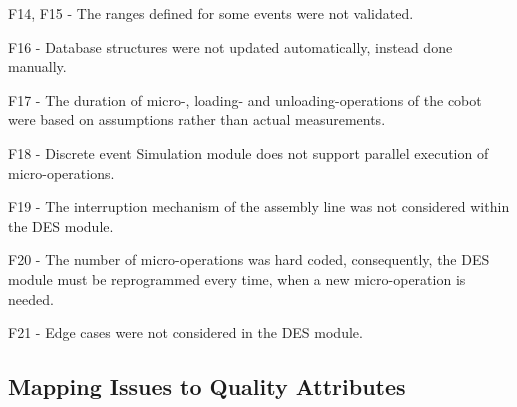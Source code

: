 \documentclass{llncs}
\begin{document}
    F14, F15 - The ranges defined for some events were not validated. 

    F16 - Database structures were not updated automatically, instead done manually.

    F17 - The duration of micro-, loading- and unloading-operations of the cobot were based on assumptions rather than actual measurements.

    F18 - Discrete event Simulation module does not support parallel execution of micro-operations. 

    F19 - The interruption mechanism of the assembly line was not considered within the DES module. 

    F20 - The number of micro-operations was hard coded, consequently, the DES module must be reprogrammed every time, when a new micro-operation is needed. 

    F21 - Edge cases were not considered in the DES module.  


    \subsection{Mapping Issues to Quality Attributes}
\end{document}
